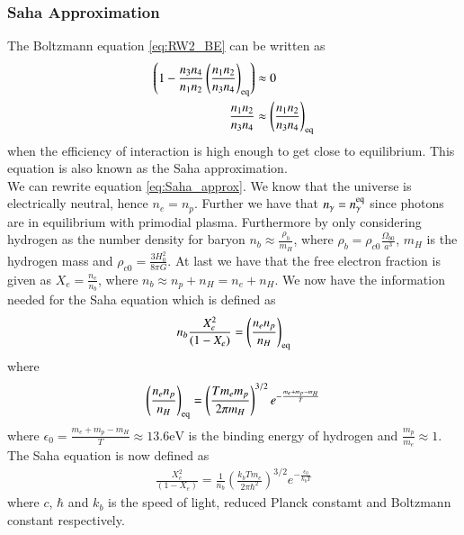 \documentclass{aa}
\begin{document}
\subsubsection{Saha Approximation}
The Boltzmann equation \eqref{eq:RW2_BE} can be written as
\begin{align}
    \left(1 - \frac{n_3 n_4}{n_1n_2} \left(\frac{n_1n_2}{n_3n_4}\right)_{\rm eq}\right) &\approx 0 \notag\\
    \frac{n_1n_2}{n_3n_4} &\approx \left(\frac{n_1n_2}{n_3n_4}\right)_{\rm eq} \label{eq:Saha_approx}
\end{align}
when the efficiency of interaction is high enough to get close to equilibrium. This equation is also known as the Saha approximation. \\
We can rewrite equation \eqref{eq:Saha_approx}. We know that the universe is electrically neutral, hence $n_e=n_p$. Further we have that $n_\gamma = n_\gamma^{\rm eq}$ since photons are in equilibrium with primodial plasma. Furthermore by only considering hydrogen as the number density for baryon $n_b \approx \frac{\rho_b}{m_H}$, where $\rho_b = \rho_{c0}\frac{\Omega_{b0}}{a^3}$, $m_H$ is the hydrogen mass and $\rho_{c0} = \frac{3H_0^2}{8\pi G}$. At last we have that the free electron fraction is given as $X_e = \frac{n_e}{n_b}$, where $n_b \approx n_p + n_H = n_e + n_H$. We now have the information needed for the Saha equation which is defined as 
\begin{align}
    n_b\frac{X_e^2}{(1 - X_e)} = \left(\frac{n_en_p}{n_H}\right)_{\rm eq} \label{eq:Saha_eq}
\end{align}
where
\begin{align*}
    \left(\frac{n_en_p}{n_H}\right)_{\rm eq} = \left(\frac{T m_em_p}{2\pi m_H}\right)^{3/2} e^{-\frac{m_e + m_p - m_H}{T}}
\end{align*}
where $\epsilon_0=\frac{m_e + m_p - m_H}{T}\approx13.6\text{eV}$ is the binding energy of hydrogen and $\frac{m_p}{m_e}\approx1$. The Saha equation is now defined as
\begin{align}
    \frac{X_e^2}{(1 - X_e)} = \frac{1}{n_b}\left(\frac{k_bT m_e}{2\pi \hbar^2}\right)^{3/2} e^{-\frac{\epsilon_0}{k_bT}} \label{eq:Saha_2}
\end{align}
where $c$, $\hbar$ and $k_b$ is the speed of light, reduced Planck constamt and Boltzmann constant respectively. 
\end{document}

